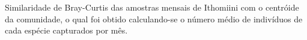 \label{fig:2.1.5} Similaridade de Bray-Curtis das amostras mensais de Ithomiini com o centróide da comunidade, o qual foi obtido calculando-se o número médio de indivíduos de cada espécie capturados por mês.
